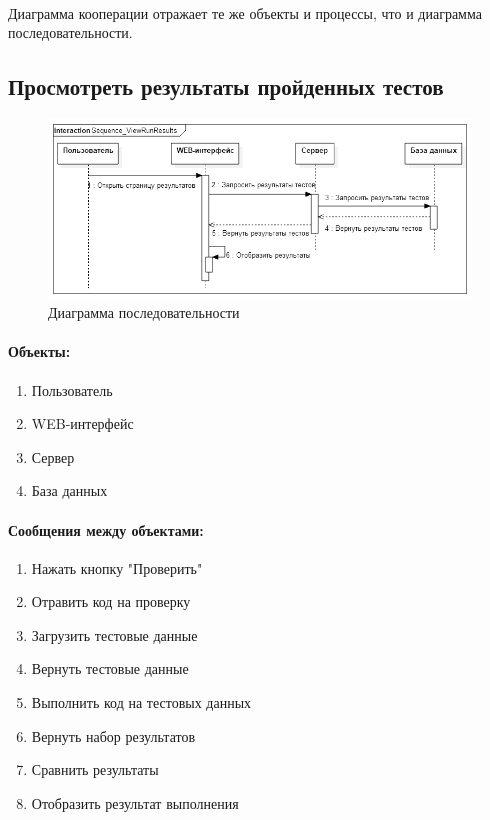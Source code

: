\documentclass{article}
\begin{document}
        \paragraph{}
        Диаграмма кооперации отражает те же объекты и процессы, что и диаграмма
        последовательности.
    
    
    \subsection{Просмотреть результаты пройденных тестов}
        \begin{figure}[H]
            \includegraphics[width=\textwidth, center]
                {Sequence_ViewRunResults}
            \caption{Диаграмма последовательности}
        \end{figure}
        \paragraph{Объекты:}
        \begin{enumerate}
            \item Пользователь
            \item WEB-интерфейс
            \item Сервер
            \item База данных
        \end{enumerate}
        \paragraph{Сообщения между объектами:}
        \begin{enumerate}
            \item Нажать кнопку "Проверить"
            \item Отравить код на проверку
            \item Загрузить тестовые данные
            \item Вернуть тестовые данные
            \item Выполнить код на тестовых данных
            \item Вернуть набор результатов
            \item Сравнить результаты
            \item Отобразить результат выполнения
        \end{enumerate}
\end{document}

